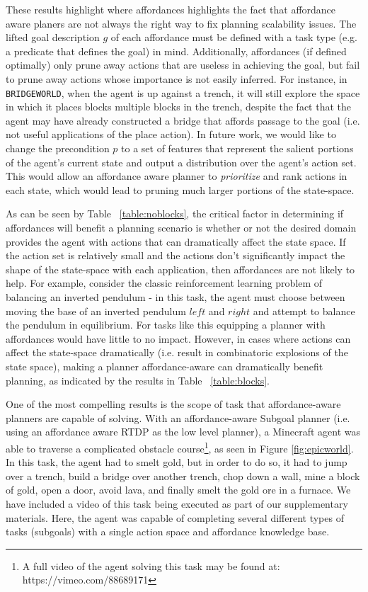 \documentclass[]{article}
\begin{document}
These results highlight where affordances highlights the fact that affordance aware planers are
not always the right way to fix planning scalability issues. The lifted goal description $g$ of
each affordance must be defined with a task type (e.g. a predicate
that defines the goal) in mind. Additionally, affordances (if defined
optimally) only prune away actions that are useless in achieving the
goal, but fail to prune away actions whose importance is not easily
inferred. For instance, in \texttt{BRIDGEWORLD}, when the agent is up
against a trench, it will still explore the space in which it places
blocks multiple blocks in the trench, despite the fact that the agent may have already
constructed a bridge that affords passage to the goal (i.e. not
useful applications of the place action). In future work, we would like
to change the precondition $p$ to a set of features that represent the
salient portions of the agent's current state and output a
distribution over the agent's action set. This would allow an
affordance aware planner to {\it prioritize} and rank actions in each
state, which would lead to pruning much larger portions of the
state-space.


As can be seen by Table ~\ref{table:noblocks}, the critical factor in determining if affordances will benefit a planning scenario is whether or not the desired domain provides the agent with actions that can dramatically affect the state space. If the action set is relatively small and the actions don't significantly impact the shape of the state-space with each application, then affordances are not likely to help. For example, consider the classic reinforcement learning problem of balancing an inverted pendulum - in this task, the agent must choose between moving the base of an inverted pendulum $left$ and $right$ and attempt to balance the pendulum in equilibrium. For tasks like this equipping a planner with affordances would have little to no impact. However, in cases where actions can affect the state-space dramatically (i.e. result in combinatoric explosions of the state space), making a planner affordance-aware can dramatically benefit planning, as indicated by the results in Table ~\ref{table:blocks}.

One of the most compelling results is the scope of task that affordance-aware planners are capable of solving. With an affordance-aware Subgoal planner (i.e. using an affordance aware RTDP as the low level planner), a Minecraft agent was able to traverse a complicated obstacle course\footnote{A full video of the agent solving this task may be found at: https://vimeo.com/88689171}, as seen in Figure \ref{fig:epicworld}. In this task, the agent had to smelt gold, but in order to do so, it had to jump over a trench, build a bridge over another trench, chop down a wall, mine a block of gold, open a door, avoid lava, and finally smelt the gold ore in a furnace. We have included a video of this task being executed as part of our supplementary materials. Here, the agent was capable of completing several different types of tasks (subgoals) with a single action space and affordance knowledge base.
\end{document}
